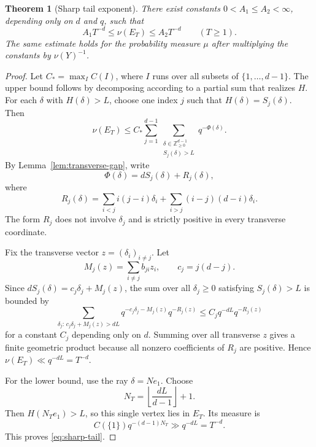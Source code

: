 \documentclass[10pt,a4paper]{amsart}
\newtheorem{theorem}{Theorem}
\newcommand{\ZZ}{\mathbb Z}
\begin{document}
\begin{theorem}[Sharp tail exponent]\label{thm:sharp-tail}
There exist constants $0<A_1\le A_2<\infty$, depending only on $d$ and $q$, such that
\begin{equation}\label{eq:sharp-tail}
  A_1T^{-d}\le \nu(E_T)\le A_2T^{-d}
  \qquad (T\ge1).
\end{equation}
The same estimate holds for the probability measure $\mu$ after multiplying the constants
by $\nu(Y)^{-1}$.
\end{theorem}

\begin{proof}
Let $C_*=\max_I C(I)$, where $I$ runs over all subsets of $\{1,\ldots,d-1\}$.  The upper
bound follows by decomposing according to a partial sum that realizes $H$.  For each
$\delta$ with $H(\delta)>L$, choose one index $j$ such that $H(\delta)=S_j(\delta)$.  Then
\[
  \nu(E_T)
  \le
  C_*\sum_{j=1}^{d-1}
  \sum_{\substack{\delta\in\ZZ_{\ge0}^{d-1}\\ S_j(\delta)>L}}
  q^{-\Phi(\delta)}.
\]
By Lemma~\ref{lem:transverse-gap}, write
\[
  \Phi(\delta)=dS_j(\delta)+R_j(\delta),
\]
where
\[
  R_j(\delta)=\sum_{i<j}i(j-i)\delta_i+
  \sum_{i>j}(i-j)(d-i)\delta_i.
\]
The form $R_j$ does not involve $\delta_j$ and is strictly positive in every transverse
coordinate.

Fix the transverse vector $z=(\delta_i)_{i\ne j}$.  Let
\[
  M_j(z)=\sum_{i\ne j}b_{ji}z_i,
  \qquad c_j=j(d-j).
\]
Since $dS_j(\delta)=c_j\delta_j+M_j(z)$, the sum over all $\delta_j\ge0$ satisfying
$S_j(\delta)>L$ is bounded by
\[
  \sum_{\delta_j:\,c_j\delta_j+M_j(z)>dL}
  q^{-c_j\delta_j-M_j(z)}q^{-R_j(z)}
  \le C_jq^{-dL}q^{-R_j(z)}
\]
for a constant $C_j$ depending only on $d$.  Summing over all transverse $z$ gives a finite
geometric product because all nonzero coefficients of $R_j$ are positive.  Hence
$\nu(E_T)\ll q^{-dL}=T^{-d}$.

For the lower bound, use the ray $\delta=Ne_1$.  Choose
\[
  N_T=\left\lfloor\frac{dL}{d-1}\right\rfloor+1.
\]
Then $H(N_Te_1)>L$, so this single vertex lies in $E_T$.  Its measure is
\[
  C(\{1\})q^{-(d-1)N_T}\gg q^{-dL}=T^{-d}.
\]
This proves \eqref{eq:sharp-tail}.
\end{proof}
\end{document}
